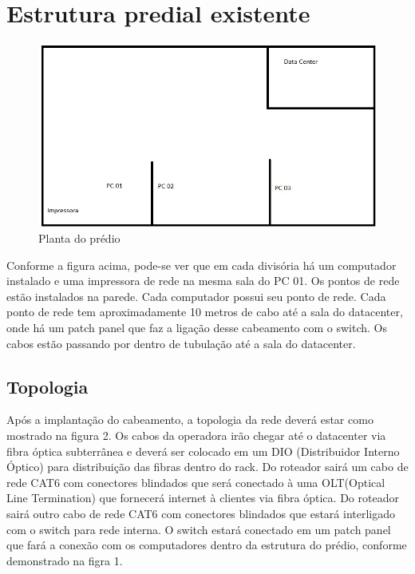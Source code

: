 \documentclass[	DIV=calc,%
paper=a4,%
fontsize=12pt,%
onecolumn]{scrartcl}	 					%
\begin{document}
	\section{Estrutura predial existente}
	\begin{figure}
		\centering
		\includegraphics[width=\textwidth]{planta}
		\caption{Planta do prédio}
		\label{planta}
	\end{figure}
	
	Conforme a figura acima, pode-se ver que em cada divisória há um computador instalado e uma impressora de rede na mesma sala do PC 01.
	Os pontos de rede estão instalados na parede. Cada computador possui seu ponto de rede.
	Cada ponto de rede tem aproximadamente 10 metros de cabo até a sala do datacenter, onde há um patch panel que faz a ligação desse cabeamento com o switch. Os cabos estão passando por dentro de tubulação até a sala do datacenter.
	
	\subsection{Topologia}
	Após a implantação do cabeamento, a topologia da rede deverá estar como mostrado na figura 2. Os cabos da operadora irão chegar até o datacenter via fibra óptica subterrânea e deverá ser colocado em um DIO (Distribuidor Interno Óptico) para distribuição das fibras dentro do rack. 
	Do roteador sairá um cabo de rede CAT6 com conectores blindados que será conectado à uma OLT(Optical Line Termination) que fornecerá internet à clientes via fibra óptica.
	Do roteador sairá outro cabo de rede CAT6 com conectores blindados que estará interligado com o switch para rede interna. O switch estará conectado em um patch panel que fará a conexão com os computadores dentro da estrutura do prédio, conforme demonstrado na figra 1.
	
\end{document}
